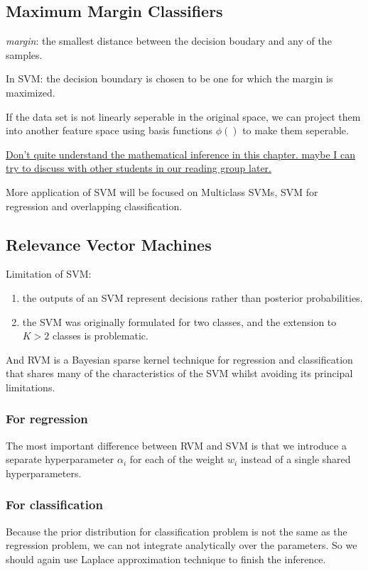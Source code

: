 \documentclass[a4paper]{book}
\begin{document}
\subsection{Maximum Margin Classifiers}
\textit{margin}: the smallest distance between the decision boudary and any of the samples.

In SVM: the decision boundary is chosen to be one for which the margin is maximized.

If the data set is not linearly seperable in the original space, we can project them into another feature space using basis functions $\phi()$  to make them seperable.

\uline{Don't quite understand the mathematical inference in this chapter.  maybe I can try to discuss with other students in our reading group later.}

More application of SVM will be focused on Multiclass SVMs, SVM for regression and overlapping classification.
\subsection{Relevance Vector Machines}
Limitation of SVM:
\begin{enumerate}
  \item the outputs of an SVM represent decisions rather than posterior probabilities.
  \item  the SVM was originally formulated for two classes, and the extension to $K > 2$ classes is problematic.
\end{enumerate}

And RVM is a Bayesian sparse kernel technique for regression and classification that shares many of the characteristics of the SVM whilst avoiding its principal limitations.

\subsubsection{For regression}
The most important difference between RVM and SVM is that we introduce a separate hyperparameter $\alpha_i$ for each of the weight $w_i$ instead of a single shared hyperparameters.
\subsubsection{For classification}
Because the prior distribution for classification problem is not the same as the regression problem, we can not integrate analytically  over the parameters.  So we should again use Laplace approximation technique to finish the inference.
\end{document}
